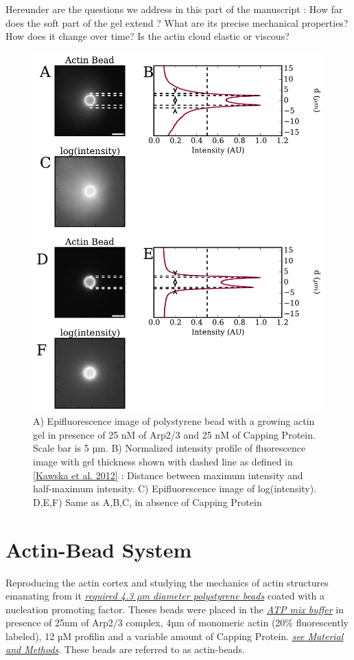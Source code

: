 \documentclass[A4paperpaper,11pt,english]{sphinxmanual}
\begin{document}
Hereunder are the questions we address in this part of the manuscript :
How far does the soft part of the gel extend ? What are its precise mechanical properties?  How does it change
over time?  Is the actin cloud elastic or viscous?
\begin{figure}[htbp]
\centering
\capstart

\includegraphics[width=0.800\linewidth]{intensity_profile_xnM_Arp_xnM_CP_xmin.pdf}
\caption{A) Epifluorescence image of polystyrene bead with a growing actin gel in
presence of 25 nM of Arp2/3 and 25 nM of Capping Protein. Scale bar is 5
µm.  B) Normalized intensity profile of fluorescence image with gel thickness
shown with dashed line as defined in {\hyperref[index-latex:kawska2012]{{[}Kawska et al. 2012{]}}} :
Distance between maximum intensity and half-maximum intensity.  C)
Epifluorescence image of log(intensity). D,E,F) Same as A,B,C, in absence
of Capping Protein}\label{index-latex:fig-intensity-profile}\end{figure}


\section{Actin-Bead System}
\label{index-latex:actin-bead-system}
Reproducing the actin cortex and studying the mechanics of actin structures
emanating from it {\hyperref[index-latex:bead-preparation]{\emph{required 4.3 µm diameter polystyrene beads}}}
coated with a nucleation promoting factor. Theses beads were placed
in the {\hyperref[index-latex:atp-mix-buffer]{\emph{ATP mix buffer}}} in presence of 25nm of Arp2/3
complex, 4µm of monomeric actin (20\% fluorescently labeled), 12 µM profilin and
a variable amount of Capping Protein. {\hyperref[index-latex:m-et-m]{\emph{see Material and Methods}}}.
These beads are referred to as actin-beads.
\end{document}
